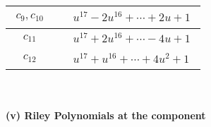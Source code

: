 \documentclass[1p]{elsarticle_modified}
\theoremstyle{definition}
\begin{document}
\begin{tabular}{m{50pt}|m{274pt}}
\hline $$\begin{aligned}c_{9},c_{10}\end{aligned}$$&$\begin{aligned}
&u^{17}-2 u^{16}+\cdots+2 u+1
\end{aligned}$\\
\hline $$\begin{aligned}c_{11}\end{aligned}$$&$\begin{aligned}
&u^{17}+2 u^{16}+\cdots-4 u+1
\end{aligned}$\\
\hline $$\begin{aligned}c_{12}\end{aligned}$$&$\begin{aligned}
&u^{17}+u^{16}+\cdots+4 u^2+1
\end{aligned}$\\
\hline
\end{tabular}\\~\\
\newpage\renewcommand{\arraystretch}{1}
\flushleft \textbf{(v) Riley Polynomials at the component}\newline \\
\end{document}
